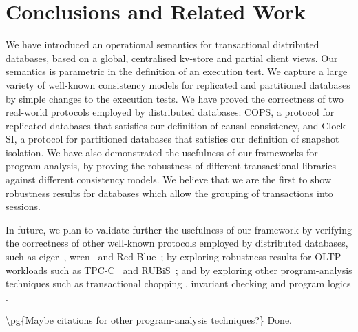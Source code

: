 \section{Conclusions and Related Work}
\label{sec:conclusions}
We have introduced  an  operational semantics for 
transactional distributed databases, based on a global, centralised 
kv-store and partial client views. 
Our semantics is parametric in the definition of an execution test.
We capture a large variety of well-known consistency models 
for replicated and partitioned databases by simple changes to  the execution tests. 
We have proved the correctness of two real-world protocols employed by distributed 
databases: COPS, a 
protocol for replicated databases that satisfies our definition of causal consistency, 
and Clock-SI, a protocol for partitioned databases that satisfies our
definition of 
snapshot isolation. We have also demonstrated the usefulness of our frameworks 
for program analysis, by proving the robustness of different transactional 
libraries against different consistency models. We believe that we are
the first to show robustness results for  databases which  allow
the grouping of  transactions into sessions. 

In future, we plan to validate further the usefulness of our framework
by verifying the correctness of other well-known protocols employed by
distributed databases, such as eiger~\cite{eiger}, wren~\cite{wren} and
Red-Blue~\cite{redblue}; by exploring robustness results for OLTP
workloads  such as TPC-C~\cite{tpcc} and RUBiS~\cite{rubis};
and by exploring other program-analysis techniques such as
transactional chopping \cite{chopping,psi-chopping}, invariant checking 
\cite{cise,repliss} and program logics \cite{alonetogether}. 

\ac{
\pg{Maybe citations for other program-analysis techniques?}
Done.
}

